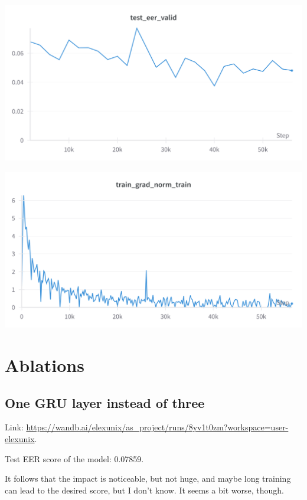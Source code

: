 \documentclass[a4paper]{article}
\begin{document}
\begin{center} \includegraphics[width=400pt]{test-eer.png} \end{center}

\begin{center} \includegraphics[width=400pt]{grad-norm.png} \end{center}



\section{Ablations}

\subsection{One GRU layer instead of three}

Link: \url{https://wandb.ai/elexunix/as_project/runs/8yv1t0zm?workspace=user-elexunix}.

Test EER score of the model: 0.07859.

It follows that the impact is noticeable, but not huge, and maybe long training can lead to the desired score, but I don't know. It seems a bit worse, though.
\end{document}
